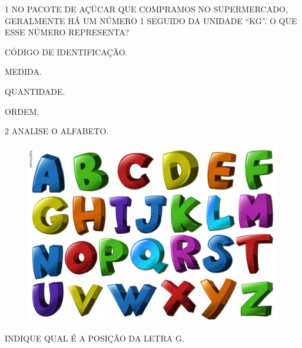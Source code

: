 \num{1} NO PACOTE DE AÇÚCAR QUE COMPRAMOS NO SUPERMERCADO, GERALMENTE HÁ UM NÚMERO
1 SEGUIDO DA UNIDADE ``KG''. O QUE ESSE NÚMERO REPRESENTA?

\begin{minipage}{.5\textwidth}
\begin{escolha}
\item CÓDIGO DE IDENTIFICAÇÃO.

\item MEDIDA.

\item QUANTIDADE.

\item ORDEM.
\end{escolha}
\end{minipage}



\num{2} ANALISE O ALFABETO.


\begin{figure}[htpb!]
\centering
\includegraphics[width=.8\textwidth]{../ilustracoes/MAT1/SAEB_1ANO_MAT_FIGURA112.png}
\end{figure}

INDIQUE QUAL É A POSIÇÃO DA LETRA G.

